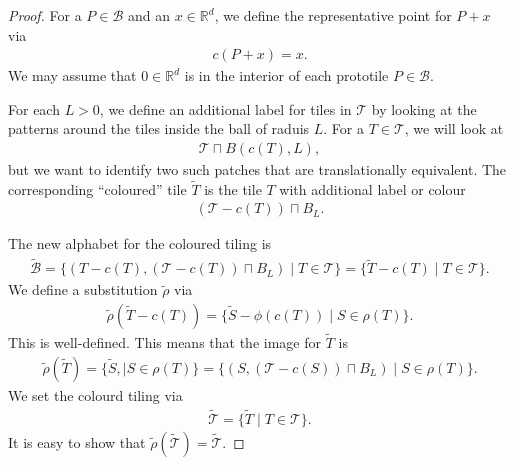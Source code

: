 \documentclass[a4]{amsart}
\theoremstyle{definition}
\begin{document}
\begin{proof}
    For a $P\in\mathcal{B}$
    and an $x\in\mathbb{R}^d$, we define the representative point for $P+x$ via
    \begin{align*}
        c(P+x)=x.
    \end{align*}
    We may assume that $0\in\mathbb{R}^d$ is in the interior of each prototile $P\in\mathcal{{B}}$.

    For each $L>0$, we
    define an additional label for tiles in
    $\mathcal{T}$ by 
    looking at the patterns around the tiles inside the ball of raduis $L$.
    For  a $T\in\mathcal{T}$, 
    we will look at
\begin{align*}\mathcal{T}\sqcap B(c(T),L),
    \end{align*}
    but we want to identify two such patches that are translationally equivalent.
    The
    corresponding ``coloured'' tile $\tilde{T}$ is the tile $T$ with additional label or colour
    \begin{align*}
        (\mathcal{T}-c(T))\sqcap B_L.
    \end{align*}

    The new alphabet for the coloured tiling is
    \begin{align*}
        \tilde{\mathcal{B}}=\{(T-c(T),(\mathcal{T}-c(T))\sqcap B_L)\mid T\in\mathcal{T}\}
        =\{\tilde{T}-c(T)\mid T\in\mathcal{T}\}.
    \end{align*} 
    We define a substitution $\tilde{\rho}$ via
    \begin{align*}
        \tilde{\rho}(\tilde{T}-c(T))=
        \{\tilde{S}-\phi(c(T))\mid S\in\rho(T)\}.
    \end{align*}
    This is well-defined.
    This means that the image for $\tilde{T}$ is
    \begin{align*}
        \tilde{\rho}(\tilde{T})=\{\tilde{S},\mid S\in\rho(T)\}=\{(S,(\mathcal{T}-c(S))\sqcap B_L)\mid S\in\rho(T)\}.
    \end{align*}
    We set the colourd tiling via
    \begin{align*}
        \tilde{\mathcal{T}}=\{\tilde{T}\mid T\in\mathcal{T}\}.
    \end{align*}
    It is easy to show that $\tilde{\rho}(\tilde{\mathcal{T}})=\tilde{\mathcal{T}}$.


\end{proof}
\end{document}

